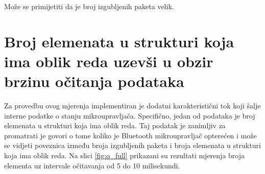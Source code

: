 \documentclass[times, utf8, diplomski]{diplomski}
\begin{document}
Može se primijetiti da je broj izgubljenih paketa velik.

\section{Broj elemenata u strukturi koja ima oblik reda uzevši u obzir brzinu očitanja podataka}

Za provedbu ovog mjerenja implementiran je dodatni karakteristični tok koji šalje interne podatke o stanju mikroupravljača.
Specifično, jedan od podataka je broj elemenata u strukturi koja ima oblik reda.
Taj podatak je zanimljiv za promatrati je govori o tome koliko je Bluetooth mikroupravljač opterećen i može se vidjeti poveznica između broja izgubljenih paketa i broja elemenata u strukturi koja ima oblik reda.
Na slici \ref{fig:q_full} prikazani su rezultati mjerenja broja elementa uz intervale očitavanja od 5 do 10 milisekundi.
\end{document}
